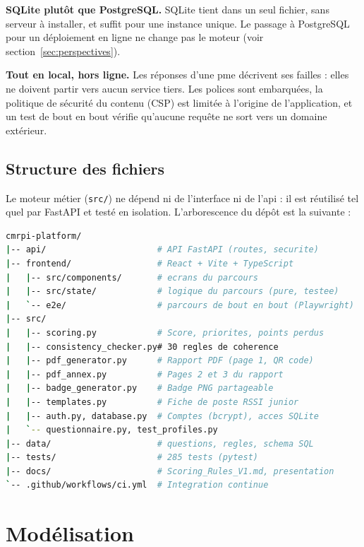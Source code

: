 \textbf{SQLite plutôt que PostgreSQL.} SQLite tient dans un seul fichier, sans serveur à installer, et suffit pour une instance unique. Le passage à PostgreSQL pour un déploiement en ligne ne change pas le moteur (voir section~\ref{sec:perspectives}).

\textbf{Tout en local, hors ligne.} Les réponses d'une \gls{pme} décrivent ses failles : elles ne doivent partir vers aucun service tiers. Les polices sont embarquées, la politique de sécurité du contenu (CSP) est limitée à l'origine de l'application, et un test de bout en bout vérifie qu'aucune requête ne sort vers un domaine extérieur.

\subsection{Structure des fichiers}
\label{sec:structure_fichiers}

Le moteur métier (\texttt{src/}) ne dépend ni de l'interface ni de l'\gls{api} : il est réutilisé tel quel par FastAPI et testé en isolation. L'arborescence du dépôt est la suivante :

\begin{lstlisting}[language=bash, caption={Structure des fichiers du dépôt}, label={lst:structure}, basicstyle=\ttfamily\footnotesize\color{iacsDark}, frame=l]
cmrpi-platform/
|-- api/                      # API FastAPI (routes, securite)
|-- frontend/                 # React + Vite + TypeScript
|   |-- src/components/       # ecrans du parcours
|   |-- src/state/            # logique du parcours (pure, testee)
|   `-- e2e/                  # parcours de bout en bout (Playwright)
|-- src/
|   |-- scoring.py            # Score, priorites, points perdus
|   |-- consistency_checker.py# 30 regles de coherence
|   |-- pdf_generator.py      # Rapport PDF (page 1, QR code)
|   |-- pdf_annex.py          # Pages 2 et 3 du rapport
|   |-- badge_generator.py    # Badge PNG partageable
|   |-- templates.py          # Fiche de poste RSSI junior
|   |-- auth.py, database.py  # Comptes (bcrypt), acces SQLite
|   `-- questionnaire.py, test_profiles.py
|-- data/                     # questions, regles, schema SQL
|-- tests/                    # 285 tests (pytest)
|-- docs/                     # Scoring_Rules_V1.md, presentation
`-- .github/workflows/ci.yml  # Integration continue
\end{lstlisting}

\section{Modélisation}
\label{sec:modelisation}

